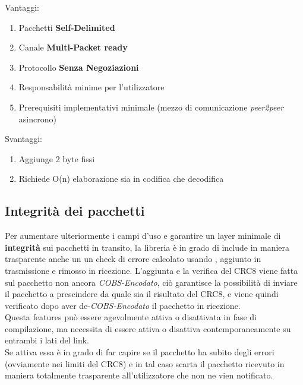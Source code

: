 \begin{multicols}{2}
	\begin{center}
		{\large \color{dkgreen}Vantaggi:}
	\end{center}
	\begin{spacing}{1.25}
		\begin{enumerate}[itemsep=-1mm]
			\item Pacchetti {\color{cadmiumgreen}\textbf{Self-Delimited}}
			\item Canale {\color{cadmiumgreen}\textbf{Multi-Packet ready}}
			\item Protocollo {\color{cadmiumgreen}\textbf{Senza Negoziazioni}}
			\item Responsabilità minime per l'utilizzatore
			\item Prerequisiti implementativi minimale (mezzo di comunicazione \textit{peer2peer} asincrono)
		\end{enumerate}
	\end{spacing}
	\vfill
	\columnbreak
	\begin{center}
		{\large \color{red} Svantaggi:}
	\end{center}
	\begin{spacing}{1.25}
		\begin{enumerate}[itemsep=-1mm]
			\item Aggiunge 2 byte fissi
			\item Richiede O(n) elaborazione sia in codifica che decodifica
		\end{enumerate}
	\end{spacing}
	\vspace*{\fill}
\end{multicols}

\subsection{Integrità dei pacchetti}\vspace{-2mm}
Per aumentare ulteriormente i campi d’uso e garantire un layer minimale di \textbf{integrità} sui pacchetti in transito, la libreria è in grado di include in maniera trasparente anche un un check di errore calcolato usando \cite{CRC8}, aggiunto in trasmissione e rimosso in ricezione. L'aggiunta e la verifica del CRC8 viene fatta sul pacchetto non ancora \textit{COBS-Encodato}, ciò garantisce la possibilità di inviare il pacchetto a prescindere da quale sia il risultato del CRC8, e viene quindi verificato dopo aver de-\textit{COBS-Encodato} il pacchetto in ricezione.\\
Questa features può essere agevolmente attiva o disattivata in fase di compilazione, ma necessita di essere attiva o disattiva contemporaneamente su entrambi i lati del link.\\
Se attiva essa è in grado di far capire se il pacchetto ha subito degli errori (ovviamente nei limiti del CRC8) e in tal caso scarta il pacchetto ricevuto in maniera totalmente trasparente all'utilizzatore che non ne vien notificato.\\

